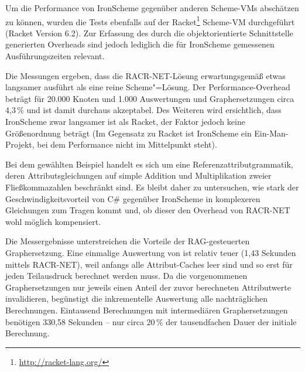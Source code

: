 Um die Performance von IronScheme gegenüber anderen Scheme-VMs abschätzen zu können, wurden die Tests ebenfalls auf der Racket\footnote{\url{http://racket-lang.org/}} Scheme-VM durchgeführt (Racket Version 6.2). Zur Erfassung des durch die objektorientierte Schnittstelle generierten Overheads sind jedoch lediglich die für IronScheme gemessenen Ausführungszeiten relevant.

Die Messungen ergeben, dass die RACR-NET-Lösung erwartungsgemäß etwas langsamer ausführt als eine reine Scheme"=Lösung. Der Performance-Overhead beträgt für 20.000 Knoten und 1.000 Auswertungen und Graphersetzungen circa 4,3\,\% und ist damit durchaus akzeptabel. Des Weiteren wird ersichtlich, dass IronScheme zwar langsamer ist als Racket, der Faktor jedoch keine Größenordnung beträgt (Im Gegensatz zu Racket ist IronScheme ein Ein-Man-Projekt, bei dem Performance nicht im Mittelpunkt steht).

Bei dem gewählten Beispiel handelt es sich um eine Referenzattributgrammatik, deren Attributsgleichungen auf simple Addition und Multiplikation zweier Fließkommazahlen beschränkt sind. Es bleibt daher zu untersuchen, wie stark der Geschwindigkeitsvorteil von C\# gegenüber IronScheme in komplexeren Gleichungen zum Tragen kommt und, ob dieser den Overhead von RACR-NET wohl möglich kompensiert.

Die Messergebnisse unterstreichen die Vorteile der RAG-gesteuerten Graphersetzung. Eine einmalige Auswertung von  ist relativ teuer (1,43 Sekunden mittels RACR-NET), weil anfangs alle Attribut-Caches leer sind und so  erst für jeden Teilausdruck berechnet werden muss. Da die vorgenommenen Graphersetzungen nur jeweils einen Anteil der zuvor berechneten Attributwerte invalidieren, begünstigt die inkrementelle Auswertung alle nachträglichen Berechnungen. Eintausend Berechnungen mit intermediären Graphersetzungen benötigen 330,58 Sekunden – nur circa 20\,\% der tausendfachen Dauer der initiale Berechnung.
